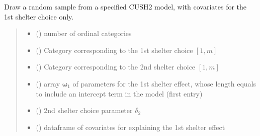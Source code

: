 \documentclass[letterpaper,10pt,english]{sphinxmanual}
\begin{document}
\begin{fulllineitems}
\label{\detokenize{cubmods:cubmods.cush2_x0.draw}}
\pysigstartsignatures
{}
\pysigstopsignatures
\sphinxAtStartPar
Draw a random sample from a specified CUSH2 model,
with covariates for the 1st shelter choice only.
\begin{quote}\begin{description}
\begin{itemize}
\item {} 
\sphinxAtStartPar
{} () \textendash{} number of ordinal categories

\item {} 
\sphinxAtStartPar
{} () \textendash{} Category corresponding to the 1st shelter choice \([1,m]\)

\item {} 
\sphinxAtStartPar
{} () \textendash{} Category corresponding to the 2nd shelter choice \([1,m]\)

\item {} 
\sphinxAtStartPar
{} () \textendash{} array \(\pmb \omega_1\) of parameters for the 1st shelter effect, whose length equals 
 to include an intercept term in the model (first entry)

\item {} 
\sphinxAtStartPar
{} () \textendash{} 2nd shelter choice parameter \(\delta_2\)

\item {} 
\sphinxAtStartPar
{} () \textendash{} dataframe of covariates for explaining the 1st shelter effect


\end{itemize}
\end{description}
\end{quote}
\end{fulllineitems}
\end{document}
